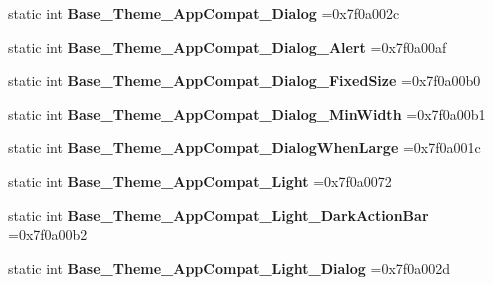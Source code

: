 \begin{DoxyCompactItemize}
static int {\bfseries Base\+\_\+\+Theme\+\_\+\+App\+Compat\+\_\+\+Dialog} =0x7f0a002c
\item 
\mbox{\label{classandroid_1_1support_1_1design_1_1R_1_1style_a4cbfbaf3a3197bc74c4a2b8367bd93c4}} 
static int {\bfseries Base\+\_\+\+Theme\+\_\+\+App\+Compat\+\_\+\+Dialog\+\_\+\+Alert} =0x7f0a00af
\item 
\mbox{\label{classandroid_1_1support_1_1design_1_1R_1_1style_ab40aea68c79d78087b200c2780d5f6e4}} 
static int {\bfseries Base\+\_\+\+Theme\+\_\+\+App\+Compat\+\_\+\+Dialog\+\_\+\+Fixed\+Size} =0x7f0a00b0
\item 
\mbox{\label{classandroid_1_1support_1_1design_1_1R_1_1style_a54e4a209cfba35def829e64773d7fe41}} 
static int {\bfseries Base\+\_\+\+Theme\+\_\+\+App\+Compat\+\_\+\+Dialog\+\_\+\+Min\+Width} =0x7f0a00b1
\item 
\mbox{\label{classandroid_1_1support_1_1design_1_1R_1_1style_a8cc76af815f1d3de255c9ea4f885d3e9}} 
static int {\bfseries Base\+\_\+\+Theme\+\_\+\+App\+Compat\+\_\+\+Dialog\+When\+Large} =0x7f0a001c
\item 
\mbox{\label{classandroid_1_1support_1_1design_1_1R_1_1style_ac9ccb90ff993d2180c1c70b1eb960d64}} 
static int {\bfseries Base\+\_\+\+Theme\+\_\+\+App\+Compat\+\_\+\+Light} =0x7f0a0072
\item 
\mbox{\label{classandroid_1_1support_1_1design_1_1R_1_1style_a6256a9bcdc00327d9330dc4458f9926d}} 
static int {\bfseries Base\+\_\+\+Theme\+\_\+\+App\+Compat\+\_\+\+Light\+\_\+\+Dark\+Action\+Bar} =0x7f0a00b2
\item 
\mbox{\label{classandroid_1_1support_1_1design_1_1R_1_1style_af9ae40509f24b6433a551ce79c44561e}} 
static int {\bfseries Base\+\_\+\+Theme\+\_\+\+App\+Compat\+\_\+\+Light\+\_\+\+Dialog} =0x7f0a002d
\item 
\mbox{\label{classandroid_1_1support_1_1design_1_1R_1_1style_a1a547afa2d0b09c6a3d7eb4474c7298d}} 

\end{DoxyCompactItemize}
